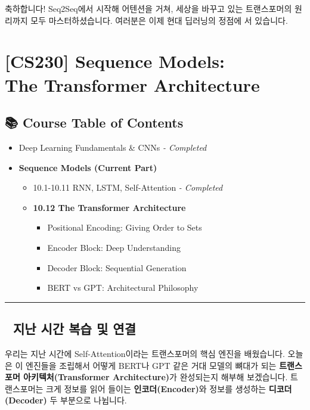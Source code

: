 \documentclass[11pt,a4paper]{book}
\theoremstyle{definition}
\begin{document}
축하합니다! Seq2Seq에서 시작해 어텐션을 거쳐, 세상을 바꾸고 있는 트랜스포머의 원리까지 모두 마스터하셨습니다. 여러분은 이제 현대 딥러닝의 정점에 서 있습니다.


\chapter{[CS230] Sequence Models: \\ The Transformer Architecture}
\label{ch:lecture51}

\section*{📚 Course Table of Contents}
\begin{itemize}
    \item[Chapter 1-9.] Deep Learning Fundamentals \& CNNs \textit{- Completed}
    \item[\textbf{Chapter 10.}] \textbf{Sequence Models (Current Part)}
    \begin{itemize}
        \item 10.1-10.11 RNN, LSTM, Self-Attention \textit{- Completed}
        \item \textbf{10.12 The Transformer Architecture}
        \begin{itemize}
            \item Positional Encoding: Giving Order to Sets
            \item Encoder Block: Deep Understanding
            \item Decoder Block: Sequential Generation
            \item BERT vs GPT: Architectural Philosophy
        \end{itemize}
    \end{itemize}
\end{itemize}

\vspace{0.5cm}
\hrule
\vspace{0.5cm}

\section*{🔗 지난 시간 복습 및 연결}
우리는 지난 시간에 Self-Attention이라는 트랜스포머의 핵심 엔진을 배웠습니다. 오늘은 이 엔진들을 조립해서 어떻게 BERT나 GPT 같은 거대 모델의 뼈대가 되는 \textbf{트랜스포머 아키텍처(Transformer Architecture)}가 완성되는지 해부해 보겠습니다. 트랜스포머는 크게 정보를 읽어 들이는 \textbf{인코더(Encoder)}와 정보를 생성하는 \textbf{디코더(Decoder)} 두 부분으로 나뉩니다.
\end{document}
